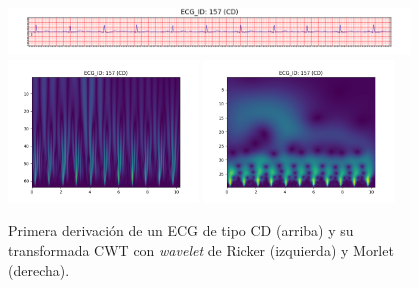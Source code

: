 \begin{figure}[t]\ContinuedFloat
	\centering
	\includegraphics[width=0.95\textwidth]{Imagenes/Vectorial/Transformadas/CD/ecg.png}
	\includegraphics[width=0.45\textwidth]{Imagenes/Vectorial/Transformadas/CD/cwt_ricker.png}
	\includegraphics[width=0.45\textwidth]{Imagenes/Vectorial/Transformadas/CD/cwt_morlet.png}
	\par Primera derivación de un ECG de tipo CD (arriba) y su transformada CWT con \emph{wavelet} de Ricker (izquierda) y Morlet (derecha).
	\vspace{1cm}
	

\end{figure}
